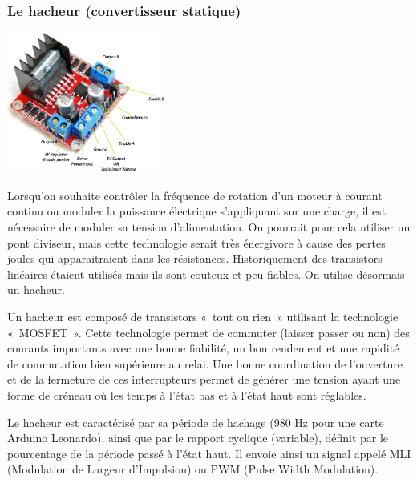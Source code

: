 \subsubsection{Le hacheur (convertisseur statique)}

\begin{minipage}[c]{2.1in}
\includegraphics[width=2.0486in,height=1.82318in]{media/image103.png} 
\end{minipage}\hfill
\begin{minipage}[c]{10cm}
Lorsqu'on souhaite contrôler la fréquence de rotation d'un moteur à
courant continu ou moduler la puissance électrique s'appliquant sur une
charge, il est nécessaire de moduler sa tension d'alimentation. On
pourrait pour cela utiliser un pont diviseur, mais cette technologie
serait très énergivore à cause des pertes joules qui apparaitraient dans
les résistances. Historiquement des transistors linéaires étaient
utilisés mais ils sont couteux et peu fiables. On utilise désormais un
hacheur.
\end{minipage}

Un hacheur est composé de transistors «~tout ou rien~» utilisant la
technologie «~MOSFET~». Cette technologie permet de commuter (laisser
passer ou non) des courants importants avec une bonne fiabilité, un bon
rendement et une rapidité de commutation bien supérieure au relai. Une
bonne coordination de l'ouverture et de la fermeture de ces
interrupteurs permet de générer une tension ayant une forme de créneau
où les temps à l'état bas et à l'état haut sont réglables. 

Le hacheur est caractérisé par sa période de hachage (980 Hz pour une
carte Arduino Leonardo), ainsi que par le rapport cyclique (variable),
définit par le pourcentage de la période passé à l'état haut. Il envoie
ainsi un signal appelé MLI (Modulation de Largeur d'Impulsion) ou PWM
(Pulse Width Modulation).

